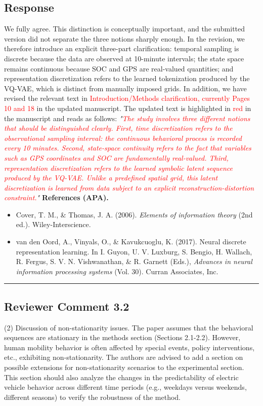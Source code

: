 \documentclass{NSF}
\begin{document}
\subsection{Response}
We fully agree. This distinction is conceptually important, and the submitted version did not separate the three notions sharply enough. In the revision, we therefore introduce an explicit three-part clarification: temporal sampling is discrete because the data are observed at 10-minute intervals; the state space remains continuous because SOC and GPS are real-valued quantities; and representation discretization refers to the learned tokenization produced by the VQ-VAE, which is distinct from manually imposed grids.
\noindent In addition, we have revised the relevant text in \textcolor{red}{Introduction/Methods clarification, currently Pages 10 and 18} in the updated manuscript. The updated text is highlighted in \textcolor{red}{red} in the manuscript and reads as follows:
\vskip 0.1cm
\noindent \textit{"\textcolor{red}{The study involves three different notions that should be distinguished clearly. First, \emph{time discretization} refers to the observational sampling interval: the continuous behavioral process is recorded every 10 minutes. Second, \emph{state-space continuity} refers to the fact that variables such as GPS coordinates and SOC are fundamentally real-valued. Third, \emph{representation discretization} refers to the learned symbolic latent sequence produced by the VQ-VAE. Unlike a predefined spatial grid, this latent discretization is learned from data subject to an explicit reconstruction-distortion constraint.}"}
\vskip 0.05in
\noindent\textbf{References (APA).}
\begin{itemize}
    \item Cover, T. M., \& Thomas, J. A. (2006). \textit{Elements of information theory} (2nd ed.). Wiley-Interscience.
    \item van den Oord, A., Vinyals, O., \& Kavukcuoglu, K. (2017). Neural discrete representation learning. In I. Guyon, U. V. Luxburg, S. Bengio, H. Wallach, R. Fergus, S. V. N. Vishwanathan, \& R. Garnett (Eds.), \textit{Advances in neural information processing systems} (Vol. 30). Curran Associates, Inc.
\end{itemize}

\noindent\rule{16.5cm}{1.0pt}

\subsection{Reviewer Comment 3.2}
\begin{mdframed}
(2) Discussion of non-stationarity issues. The paper assumes that the behavioral sequences are stationary in the methods section (Sections 2.1-2.2). However, human mobility behavior is often affected by special events, policy interventions, etc., exhibiting non-stationarity. The authors are advised to add a section on possible extensions for non-stationarity scenarios to the experimental section. This section should also analyze the changes in the predictability of electric vehicle behavior across different time periods (e.g., weekdays versus weekends, different seasons) to verify the robustness of the method.
\end{mdframed}
\end{document}
